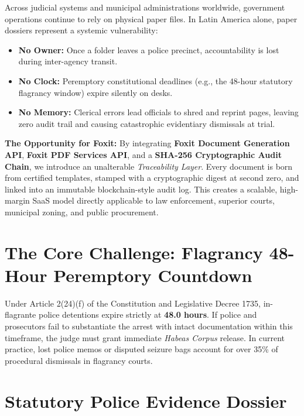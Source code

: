\documentclass[11pt,a4paper]{article}
\begin{document}
Across judicial systems and municipal administrations worldwide, government operations continue to rely on physical paper files. In Latin America alone, paper dossiers represent a systemic vulnerability:
\begin{itemize}[leftmargin=1.5em,itemsep=2pt,topsep=2pt]
    \item \textbf{No Owner:} Once a folder leaves a police precinct, accountability is lost during inter-agency transit.
    \item \textbf{No Clock:} Peremptory constitutional deadlines (e.g., the 48-hour statutory flagrancy window) expire silently on desks.
    \item \textbf{No Memory:} Clerical errors lead officials to shred and reprint pages, leaving zero audit trail and causing catastrophic evidentiary dismissals at trial.
\end{itemize}

\textbf{The Opportunity for Foxit:} By integrating \textbf{Foxit Document Generation API}, \textbf{Foxit PDF Services API}, and a \textbf{SHA-256 Cryptographic Audit Chain}, we introduce an unalterable \emph{Traceability Layer}. Every document is born from certified templates, stamped with a cryptographic digest at second zero, and linked into an immutable blockchain-style audit log. This creates a scalable, high-margin SaaS model directly applicable to law enforcement, superior courts, municipal zoning, and public procurement.

\section{The Core Challenge: Flagrancy 48-Hour Peremptory Countdown}
Under Article 2(24)(f) of the Constitution and Legislative Decree 1735, in-flagrante police detentions expire strictly at \textbf{48.0 hours}. If police and prosecutors fail to substantiate the arrest with intact documentation within this timeframe, the judge must grant immediate \emph{Habeas Corpus} release. In current practice, lost police memos or disputed seizure bags account for over 35\% of procedural dismissals in flagrancy courts.

\newpage
\section{Statutory Police Evidence Dossier}
\end{document}
